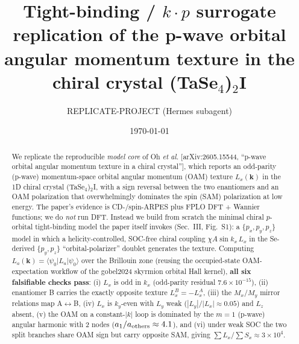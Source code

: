 \documentclass[aps,prl,twocolumn,superscriptaddress,floatfix]{revtex4-2}
\begin{document}
\title{Tight-binding / $k\!\cdot\!p$ surrogate replication of the p-wave orbital
angular momentum texture in the chiral crystal (TaSe$_4$)$_2$I}
\author{REPLICATE-PROJECT (Hermes subagent)}
\date{\today}

\begin{abstract}
We replicate the reproducible \emph{model core} of Oh \textit{et al.}
[arXiv:2605.15544, ``p-wave orbital angular momentum texture in a chiral
crystal''], which reports an odd-parity (p-wave) momentum-space orbital
angular momentum (OAM) texture $L_x(\bm{k})$ in the 1D chiral crystal
(TaSe$_4$)$_2$I, with a sign reversal between the two enantiomers and an OAM
polarization that overwhelmingly dominates the spin (SAM) polarization at low
energy. The paper's evidence is CD-/spin-ARPES plus FPLO DFT + Wannier
functions; we do \emph{not} run DFT. Instead we build from scratch the minimal
chiral $p$-orbital tight-binding model the paper itself invokes (Sec.~III,
Fig.~S1): a $\{p_x,p_y,p_z\}$ model in which a helicity-controlled, SOC-free
chiral coupling $\chi A\sin k_x\,L_x$ in the Se-derived $\{p_y,p_z\}$
``orbital-polarizer'' doublet generates the texture. Computing
$L_a(\bm{k})=\langle\psi_0|L_a|\psi_0\rangle$ over the Brillouin zone (reusing
the occupied-state OAM-expectation workflow of the gobel2024 skyrmion orbital
Hall kernel), \textbf{all six falsifiable checks pass}: (i) $L_x$ is odd in
$k_x$ (odd-parity residual $7.6\times10^{-15}$), (ii) enantiomer B carries the
exactly opposite texture $L_x^B=-L_x^A$, (iii) the $M_x/M_y$ mirror relations
map A$\leftrightarrow$B, (iv) $L_x$ is $k_y$-even with $L_y$ weak
($|L_y|/|L_x|\approx0.05$) and $L_z$ absent, (v) the OAM on a constant-$|k|$
loop is dominated by the $m=1$ (p-wave) angular harmonic with 2 nodes
($a_1/a_{\rm others}\approx4.1$), and (vi) under weak SOC the two split branches
share OAM sign but carry opposite SAM, giving
$\sum L_x/\sum S_x\approx3\times10^{4}$.
\end{abstract}

\maketitle
\end{document}
